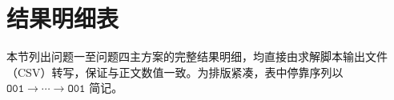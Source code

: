 \section{结果明细表}

本节列出问题一至问题四主方案的完整结果明细，均直接由求解脚本输出文件（CSV）转写，保证与正文数值一致。为排版紧凑，表中停靠序列以 $\texttt{O01}\to\cdots\to\texttt{O01}$ 简记。












